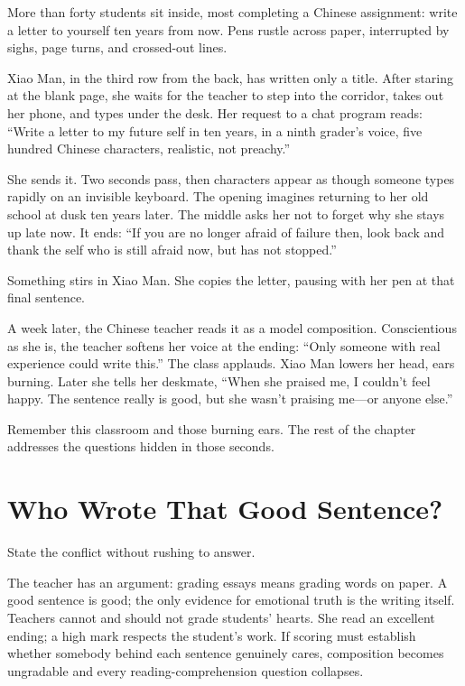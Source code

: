 More than forty students sit inside, most completing a Chinese assignment: write a letter to yourself ten years from now. Pens rustle across paper, interrupted by sighs, page turns, and crossed-out lines.

Xiao Man, in the third row from the back, has written only a title. After staring at the blank page, she waits for the teacher to step into the corridor, takes out her phone, and types under the desk. Her request to a chat program reads: ``Write a letter to my future self in ten years, in a ninth grader's voice, five hundred Chinese characters, realistic, not preachy.''

She sends it. Two seconds pass, then characters appear as though someone types rapidly on an invisible keyboard. The opening imagines returning to her old school at dusk ten years later. The middle asks her not to forget why she stays up late now. It ends: ``If you are no longer afraid of failure then, look back and thank the self who is still afraid now, but has not stopped.''

Something stirs in Xiao Man. She copies the letter, pausing with her pen at that final sentence.

A week later, the Chinese teacher reads it as a model composition. Conscientious as she is, the teacher softens her voice at the ending: ``Only someone with real experience could write this.'' The class applauds. Xiao Man lowers her head, ears burning. Later she tells her deskmate, ``When she praised me, I couldn't feel happy. The sentence really is good, but she wasn't praising me---or anyone else.''

Remember this classroom and those burning ears. The rest of the chapter addresses the questions hidden in those seconds.

\section{Who Wrote That Good Sentence?}
State the conflict without rushing to answer.

The teacher has an argument: grading essays means grading words on paper. A good sentence is good; the only evidence for emotional truth is the writing itself. Teachers cannot and should not grade students' hearts. She read an excellent ending; a high mark respects the student's work. If scoring must establish whether somebody behind each sentence genuinely cares, composition becomes ungradable and every reading-comprehension question collapses.

